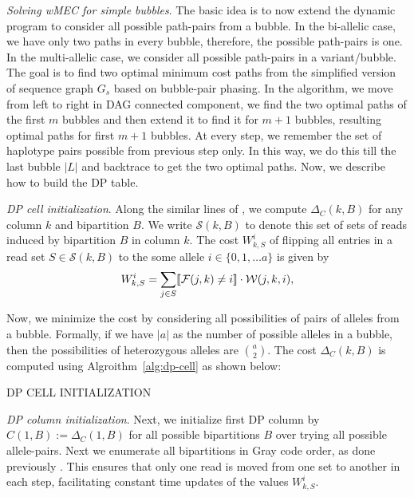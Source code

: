 \textit{Solving wMEC for simple bubbles}. The basic idea is to now extend the dynamic program to consider all possible path-pairs from a bubble. 
In the bi-allelic case, we have only two paths in every bubble, therefore, the possible path-pairs is one. 
In the multi-allelic case, we consider all possible path-pairs in a variant/bubble. The goal  is to find two optimal minimum cost paths from the simplified version of sequence graph $G_s$ based on bubble-pair phasing.
In the algorithm, we move from left to right in DAG connected component, we find the two optimal paths of the first $m$ bubbles and then extend it to find it for $m+1$ bubbles, resulting optimal paths for first $m+1$ bubbles.
At every step, we remember the set of haplotype pairs possible from previous step only.
In this way, we do this till the last bubble $|L|$ and backtrace to get the two optimal paths.
Now, we describe how to build the DP table.

\textit{DP cell initialization}. Along the similar lines of \citep{ ...}, we compute $\Delta_C(k,B)$ for any column $k$ and bipartition $B$.
We write $\mathcal{S}(k,B)$ to denote this set of sets of reads induced by bipartition $B$ in column $k$.
The cost $W_{k,S}^i$ of flipping all entries in a read set $S\in \mathcal{S}(k,B)$ to the some allele $i\in\{0,1,\ldots a\}$ is given by 
\[W_{k,S}^i = \sum_{j\in S}\llbracket \mathcal{F}(j,k)\neq i\rrbracket\cdot\mathcal{W}(j,k,i),\]

Now, we minimize the cost by considering all possibilities of pairs of alleles from a bubble. Formally, if we have $|a|$ as the number of possible alleles in a bubble, then the possibilities of heterozygous alleles are ${a \choose 2}$.
The cost $\Delta_C(k,B)$ is computed using Algroithm~\ref{alg:dp-cell} as shown below:

\begin{algorithm}
    \caption{\label{alg:dp-cell}\textsc{DP CELL INITIALIZATION}}
\end{algorithm}

\textit{DP column initialization}. Next, we initialize first DP column by $C(1,B):=\Delta_C(1,B)$ for all possible bipartitions $B$ over trying all possible allele-pairs.
Next we enumerate all bipartitions in Gray code order, as done previously \citep{ ...}.
This ensures that only one read is moved from one set to another in each step, facilitating constant time updates of the values $W_{k,S}^i$.

